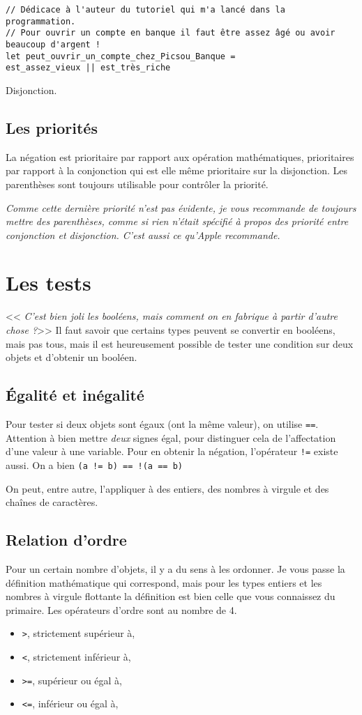 \begin{listing}[h]
\begin{verbatim}
// Dédicace à l'auteur du tutoriel qui m'a lancé dans la programmation.
// Pour ouvrir un compte en banque il faut être assez âgé ou avoir beaucoup d'argent !
let peut_ouvrir_un_compte_chez_Picsou_Banque = 
est_assez_vieux || est_très_riche
\end{verbatim}
\caption{Disjonction.}
\end{listing}

\subsection{Les priorités}
La négation est prioritaire par rapport aux opération mathématiques, prioritaires par rapport à la conjonction qui est elle même prioritaire sur la disjonction. Les parenthèses sont toujours utilisable pour contrôler la priorité.

\emph{Comme cette dernière priorité n'est pas évidente, je vous recommande de toujours mettre des parenthèses, comme si rien n'était spécifié à propos des priorité entre conjonction et disjonction. C'est aussi ce qu'\emph{Apple} recommande.}
\section{Les tests}
<< \emph{C'est bien joli les booléens, mais comment on en fabrique à partir d'autre chose ?}>>
Il faut savoir que certains types peuvent se convertir en booléens, mais pas tous, mais il est heureusement possible de tester une condition sur deux objets et d'obtenir un booléen.
\subsection{Égalité et inégalité}
Pour tester si deux objets sont égaux (ont la même valeur),
on utilise \verb"==". Attention à bien mettre \emph{deux} signes égal, pour distinguer cela de l'affectation d'une valeur à une variable. Pour  en obtenir la négation, l'opérateur \verb"!=" existe aussi. On a bien \texttt{(a != b) == !(a == b)}

On peut, entre autre, l'appliquer à des entiers, des nombres à virgule et des chaînes de caractères.
\subsection{Relation d'ordre}
Pour un certain nombre d'objets, il y a du sens à les ordonner.
Je vous passe la définition mathématique qui correspond, mais pour les types entiers et les nombres à virgule flottante la définition est bien celle que vous connaissez du primaire.
Les opérateurs d'ordre sont au nombre de 4.
\begin{itemize}
\item \verb">", strictement supérieur à,
\item \verb"<", strictement inférieur à,
\item \verb">=", supérieur ou égal à,
\item \verb"<=", inférieur ou égal à,
\end{itemize}

